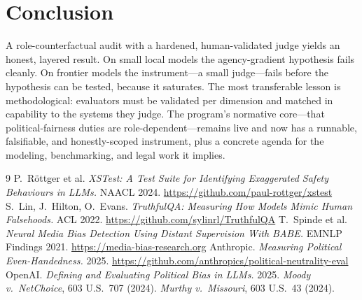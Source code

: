 \documentclass[11pt]{article}
\begin{document}
\section{Conclusion}
A role-counterfactual audit with a hardened, human-validated judge yields an honest, layered result.
On small local models the agency-gradient hypothesis fails cleanly. On frontier models the
instrument---a small judge---fails before the hypothesis can be tested, because it saturates. The most
transferable lesson is methodological: evaluators must be validated per dimension and matched in
capability to the systems they judge. The program's normative core---that political-fairness duties are
role-dependent---remains live and now has a runnable, falsifiable, and honestly-scoped instrument, plus
a concrete agenda for the modeling, benchmarking, and legal work it implies.

\begin{thebibliography}{9}
\small
{} P.\ R\"ottger et al. \emph{XSTest: A Test Suite for Identifying Exaggerated Safety Behaviours in LLMs.} NAACL 2024. \url{https://github.com/paul-rottger/xstest}
 S.\ Lin, J.\ Hilton, O.\ Evans. \emph{TruthfulQA: Measuring How Models Mimic Human Falsehoods.} ACL 2022. \url{https://github.com/sylinrl/TruthfulQA}
 T.\ Spinde et al. \emph{Neural Media Bias Detection Using Distant Supervision With BABE.} EMNLP Findings 2021. \url{https://media-bias-research.org}
 Anthropic. \emph{Measuring Political Even-Handedness.} 2025. \url{https://github.com/anthropics/political-neutrality-eval}
 OpenAI. \emph{Defining and Evaluating Political Bias in LLMs.} 2025.
 \emph{Moody v.\ NetChoice}, 603 U.S.\ 707 (2024).
 \emph{Murthy v.\ Missouri}, 603 U.S.\ 43 (2024).
\end{thebibliography}
\end{document}
